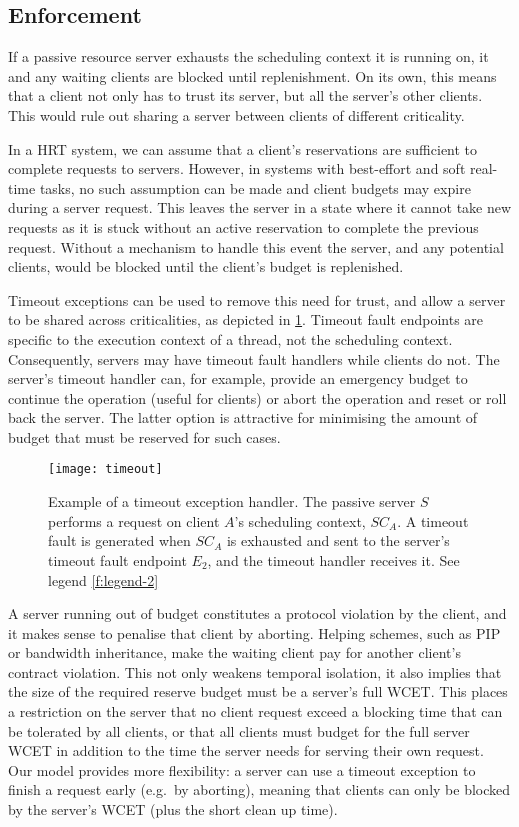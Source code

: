 \subsection{Enforcement}

If a passive resource server exhausts the scheduling context it is running on, it and any waiting clients
are blocked until replenishment. On its own, this means that a client
not only has to trust its server, but all the server's other
clients. This would rule out sharing a server between clients of
different criticality.

In a \gls{HRT} system, we can assume that a client's reservations are sufficient to complete
requests to servers.  However, in systems with best-effort and soft real-time tasks, no such
assumption can be made and client budgets may expire during a server request.  This leaves the
server in a state where it cannot take new requests as it is stuck without an active reservation to
complete the previous request.  Without a mechanism to handle this event the server, and any
potential clients, would be blocked until the client's budget is replenished.

Timeout exceptions can be used to remove this need for trust, and
allow a server to be shared across criticalities, as depicted in \cref{f:timeout}. Timeout fault endpoints are specific to the
execution context of a thread, not the scheduling context. Consequently, servers may have timeout
fault handlers while clients do not. The 
server's timeout handler can, for example, provide an emergency budget
to continue the operation (useful for  clients) or abort
the operation and reset or roll back the server. The latter option is
attractive for minimising the amount of budget that must be reserved
for such cases.

\begin{figure}
    \centering
    \texttt{[image: timeout]}
    \caption[Example of a timeout exception handler.]{Example of a timeout exception handler. The passive server $S$ performs a request on
    client $A$'s scheduling context, $SC_{A}$. A timeout fault is generated when $SC_{A}$ is
exhausted and sent to the server's timeout fault endpoint $E_{2}$, and the timeout handler receives
it. See legend \cref{f:legend-2}}
    \label{f:timeout}
\end{figure}


A server running out of budget constitutes a protocol violation
by the client, and it makes sense to penalise that
client by aborting. Helping schemes, such as \gls{PIP} or bandwidth
inheritance,
make the waiting client pay for
another client's contract violation. This not only weakens temporal isolation,
it also implies that the size of the required reserve budget
must be a server's full WCET. This places a restriction on the server
that no client request exceed a blocking time that can be tolerated by
all clients, or that all clients must budget for the full server WCET in
addition to the time the server needs for serving their own request.
Our model provides more flexibility: a server can use a timeout
exception to finish a request early (e.g.\ by aborting), meaning that clients can only be
blocked by the server's \gls{WCET} (plus the short
clean up time).

